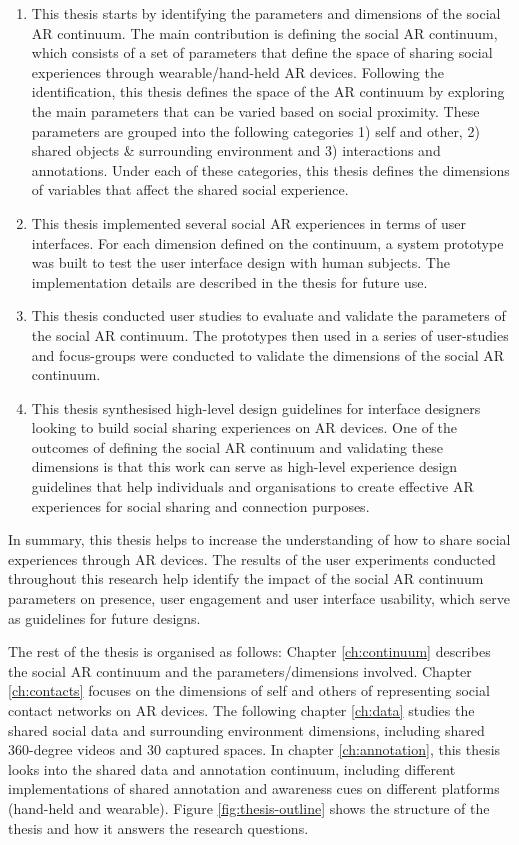 \begin{enumerate}
    \item This thesis starts by identifying the parameters and dimensions of the social AR continuum. The main contribution is defining the social AR continuum, which consists of a set of parameters that define the space of sharing social experiences through wearable/hand-held AR devices. Following the identification, this thesis defines the space of the AR continuum by exploring the main parameters that can be varied based on social proximity. These parameters are grouped into the following categories 1) self and other, 2) shared objects \& surrounding environment and 3) interactions and annotations. Under each of these categories, this thesis defines the dimensions of variables that affect the shared social experience.
    
    \item This thesis implemented several social AR experiences in terms of user interfaces. For each dimension defined on the continuum, a system prototype was built to test the user interface design with human subjects. The implementation details are described in the thesis for future use.
    
    \item This thesis conducted user studies to evaluate and validate the parameters of the social AR continuum. The prototypes then used in a series of user-studies and focus-groups were conducted to validate the dimensions of the social AR continuum.
    
    \item This thesis synthesised high-level design guidelines for interface designers looking to build social sharing experiences on AR devices. One of the outcomes of defining the social AR continuum and validating these dimensions is that this work can serve as high-level experience design guidelines that help individuals and organisations to create effective AR experiences for social sharing and connection purposes.
\end{enumerate}

In summary, this thesis helps to increase the understanding of how to share social experiences through AR devices. The results of the user experiments conducted throughout this research help identify the impact of the social AR continuum parameters on presence, user engagement and user interface usability, which serve as guidelines for future designs. 

The rest of the thesis is organised as follows: Chapter \ref{ch:continuum} describes the social AR continuum and the parameters/dimensions involved. 
Chapter \ref{ch:contacts} focuses on the dimensions of self and others of representing social contact networks on AR devices. 
The following chapter \ref{ch:data} studies the shared social data and surrounding environment dimensions, including shared 360-degree videos and 30 captured spaces. 
In chapter \ref{ch:annotation}, this thesis looks into the shared data and annotation continuum, including different implementations of shared annotation and awareness cues on different platforms (hand-held and wearable).
Figure \ref{fig:thesis-outline} shows the structure of the thesis and how it answers the research questions. 

